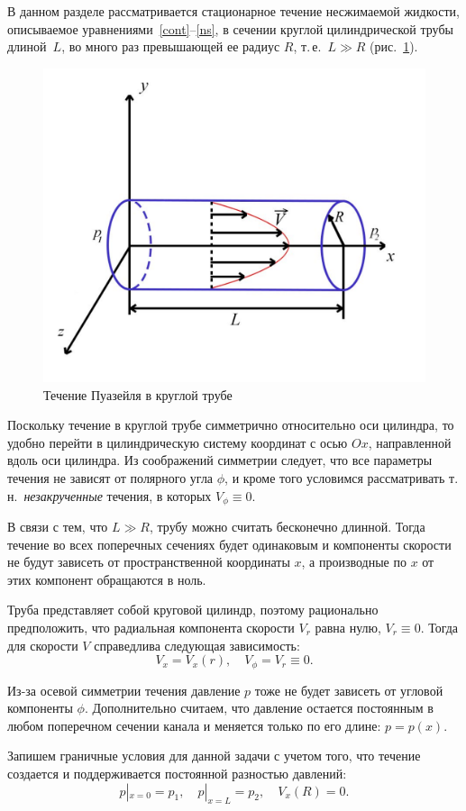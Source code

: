 \documentclass[12pt, a4paper]{article}
\begin{document}
В данном разделе рассматривается стационарное течение несжимаемой жидкости, описываемое уравнениями~\eqref{cont}--\eqref{ns}, в сечении круглой цилиндрической трубы длиной~$L$, во много раз превышающей ее радиус $R$, т.\,е.\ $L\gg R$ (рис.~\ref{planeflow2}).

\begin{figure}[!h]
\centering
\includegraphics[width=0.55\linewidth]{planeflow2}
\caption{Течение Пуазейля в круглой трубе}\label{planeflow2}
\end{figure}

Поскольку течение в круглой трубе симметрично относительно оси цилиндра, то удобно перейти в цилиндрическую систему координат с осью $Ox$, направленной вдоль оси цилиндра. Из соображений симметрии следует, что все параметры течения не зависят от полярного угла $\phi$, и кроме того условимся рассматривать т.\,н.~\emph{незакрученные} течения, в которых $V_{\phi}\equiv0$.


В связи с тем, что $L\gg R$, трубу можно считать бесконечно длинной. Тогда течение во всех поперечных сечениях будет одинаковым и компоненты скорости не будут зависеть от пространственной координаты $x$, а производные по $x$ от этих компонент обращаются в ноль.

Труба представляет собой круговой цилиндр, поэтому рационально предположить, что радиальная компонента скорости $V_r$ равна нулю, $V_r\equiv0$. Тогда для скорости $V$ справедлива следующая зависимость:
\[
	V_x=V_x(r), \quad V_{\phi}=V_r\equiv0.
\]

Из-за осевой симметрии течения давление $p$ тоже не будет зависеть от угловой компоненты $\phi$. Дополнительно считаем, что давление остается постоянным в любом поперечном сечении канала и меняется только по его длине: $p=p(x)$.

Запишем граничные условия для данной задачи с учетом того, что течение создается и поддерживается постоянной разностью давлений:
\[
 p|_{x=0} = p_1, \quad p|_{x=L} = p_2, \quad	V_x(R)=0.
\]
\end{document}
